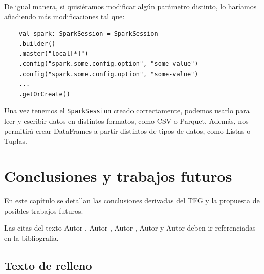 \documentclass[12pt,twoside,titlepage]{report}
\newcommand\blankpage{%
    \newpage
    \null
    \thispagestyle{empty}%
    \newpage}
\begin{document}
De igual manera, si quisiéramos modificar algún parámetro distinto, lo haríamos añadiendo más modificaciones tal que: 

\begin{lstlisting}
	val spark: SparkSession = SparkSession
	.builder()
	.master("local[*]")
	.config("spark.some.config.option", "some-value")
	.config("spark.some.config.option", "some-value")
	...
	.getOrCreate()
\end{lstlisting}

Una vez tenemos el \texttt{SparkSession} creado correctamente, podemos usarlo para leer y escribir datos en distintos formatos, como CSV o Parquet. Además, nos permitirá crear DataFrames a partir distintos de tipos de datos, como Listas o Tuplas.





\chapter{Conclusiones y trabajos futuros}
\newpage

En este capítulo se detallan las conclusiones derivadas del TFG y la propuesta de posibles trabajos futuros.

Las citas del texto Autor \cite{giaquinta}, Autor \cite{fortune}, Autor \cite{fortuneB}, Autor \cite{mitchell} y Autor \cite{morrey} deben ir referenciadas en la bibliografia.


\section{Texto de relleno}

\blankpage










{}

\footnotesize{
%


}



\raggedbottom
\afterpage{\blankpage}

\newpage




\end{document}
